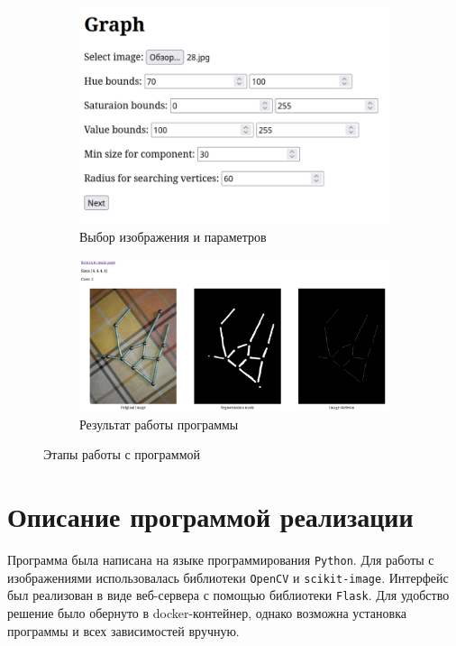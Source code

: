 \documentclass[11pt]{extarticle}
\begin{document}
\begin{figure}[h]
  \centering
  \begin{subfigure}[b]{0.4\textwidth}
    \includegraphics[width=\textwidth]{server1}
    \caption{Выбор изображения и параметров}
  \end{subfigure}
  \begin{subfigure}[b]{\textwidth}
    \includegraphics[width=\textwidth]{server2}
    \caption{Результат работы программы}
  \end{subfigure}
  \caption{Этапы работы с программой}
  \label{fig:program}
\end{figure}

\section{Описание программой реализации}
Программа была написана на языке программирования \verb|Python|. Для работы с изображениями использовалась библиотеки \verb|OpenCV| и \verb|scikit-image|.  Интерфейс был реализован в виде веб-сервера с помощью библиотеки \verb|Flask|. Для удобство решение было обернуто в docker-контейнер, однако возможна установка программы и всех зависимостей вручную.
\end{document}
